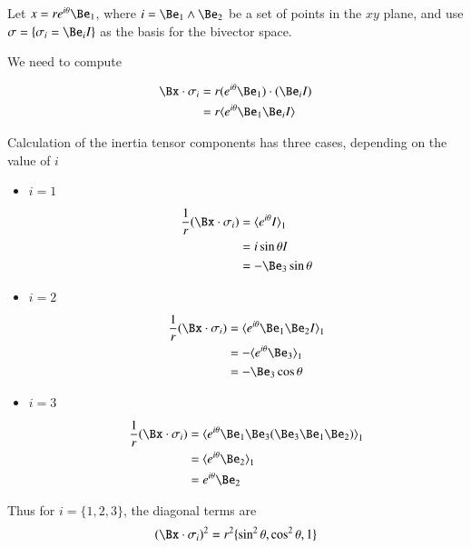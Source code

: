 Let $x = re^{i\theta}\Be_1$, where $i=\Be_1 \wedge \Be_2$ be a set of points in the $xy$ plane, and use $\sigma = \{\sigma_i = \Be_i I\}$ as the basis for the  bivector space.

We need to compute

\begin{align*}
\Bx \cdot \sigma_i 
&= r(e^{i\theta} \Be_1) \cdot ( \Be_i I ) \\
&= r\langle{ e^{i\theta} \Be_1 \Be_i I }\rangle \\
\end{align*}

Calculation of the inertia tensor components has three cases, depending on the value of $i$

\begin{itemize}
\item $i=1$

\begin{align*}
\frac{1}{r}(\Bx \cdot \sigma_i) 
&= {\langle e^{i\theta} I\rangle}_1 \\
&= i \sin\theta I \\
&= - \Be_3 \sin\theta \\
\end{align*}

\item $i=2$

\begin{align*}
\frac{1}{r}(\Bx \cdot \sigma_i) 
&= {\langle e^{i\theta} \Be_1 \Be_2 I\rangle}_1 \\
&= -{\langle e^{i\theta} \Be_3 \rangle}_1 \\
&= - \Be_3 \cos\theta \\
\end{align*}

\item $i=3$

\begin{align*}
\frac{1}{r}(\Bx \cdot \sigma_i) 
&= {\langle e^{i\theta} \Be_1 \Be_3 (\Be_3 \Be_1 \Be_2) \rangle}_1 \\
&= {\langle e^{i\theta} \Be_2 \rangle}_1 \\
&= e^{i\theta} \Be_2 \\
\end{align*}

\end{itemize}

Thus for $i=\{1, 2, 3\}$, the diagonal terms are
\[
(\Bx \cdot \sigma_i)^2 = r^2 \{ \sin^2 \theta, \cos^2 \theta, 1\}
\]

